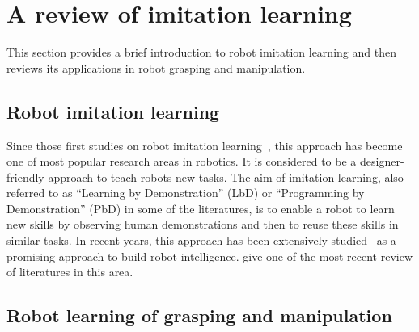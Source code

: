 \section{A review of imitation learning}
\label{cha2:sec2}

This section provides a brief introduction to robot imitation learning and then reviews its applications in robot grasping and manipulation.

\subsection{Robot imitation learning}
\label{cha2:sec2:learning}
Since those first studies on robot imitation learning~\citep{hayes1994robot,friedrich1996robot}, this approach has become one of most popular research areas in robotics. It is considered to be a designer-friendly approach to teach robots new tasks. The aim of imitation learning, also referred to as ``Learning by Demonstration'' (LbD) or ``Programming by Demonstration'' (PbD) in some of the literatures, is to enable a robot to learn new skills by observing human demonstrations and then to reuse these skills in similar tasks. In recent years, this approach has been extensively studied~\citep{dillmann2004teaching,calinon2007learning,calinon2008robot,kulic2012incremental} as a promising approach to build robot intelligence.
\citet{argall2009survey} give one of the most recent review of literatures in this area.

\subsection{Robot learning of grasping and manipulation}
\label{cha2:sec2:grasping-learning}



